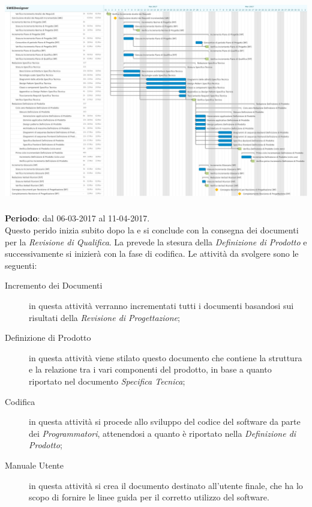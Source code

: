 {\includegraphics[width=15cm]{img/ganttpa.png}\par}

	\subsubsection{\PDC} \label{sec:PDC}
	\textbf{Periodo}: dal 06-03-2017 al 11-04-2017.	
	\\ Questo perido inizia subito dopo la \PA{} e si conclude con la consegna dei documenti per la \emph{Revisione di Qualifica}. La \PDC{} prevede la stesura della \emph{Definizione di Prodotto} e successivamente si inizierà con la fase di codifica. Le attività da svolgere sono le seguenti:
	\begin{description}
		\item[Incremento dei Documenti] in questa attività verranno incrementati tutti i documenti basandosi sui risultati della \emph{Revisione di Progettazione}; 
		\item[Definizione di Prodotto] in questa attività viene stilato questo documento che contiene la struttura e la relazione tra i vari componenti del prodotto, in base a quanto riportato nel documento \emph{Specifica Tecnica};
		\item[Codifica] in questa attività si procede allo sviluppo del codice del software da parte dei \emph{Programmatori}, attenendosi a quanto è riportato nella \emph{Definizione di Prodotto}; 
		\item[Manuale Utente] in questa attività si crea il documento destinato all'utente finale, che ha lo scopo di fornire le linee guida per il corretto utilizzo del software.
	\end{description}

